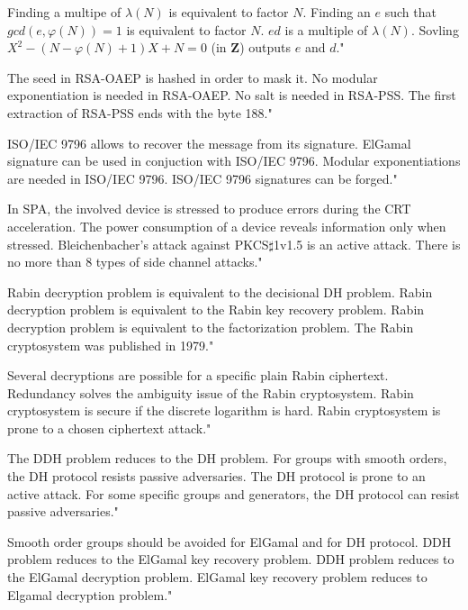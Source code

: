 {Finding a multipe of $\lambda(N)$ is equivalent to factor $N$.}
{Finding an $e$ such that $gcd(e,\varphi(N))=1$ is equivalent to factor $N$.}
{$ed$ is a multiple of $\lambda(N)$.}
{Sovling $X^2-(N-\varphi(N)+1)X+N=0$ (in $\mathbf{Z}$) outputs $e$ and $d$."}

{The seed in RSA-OAEP is hashed in order to mask it.}
{No modular exponentiation is needed in RSA-OAEP.}
{No salt is needed in RSA-PSS.}
{The first extraction of RSA-PSS ends with the byte 188."}

{ISO/IEC 9796 allows to recover the message from its signature.}
{ElGamal signature can be used in conjuction with ISO/IEC 9796.}
{Modular exponentiations are needed in ISO/IEC 9796.}
{ISO/IEC 9796 signatures can be forged."}

{In SPA, the involved device is stressed to produce errors during the CRT acceleration.}
{The power consumption of a device reveals information only when stressed.}
{Bleichenbacher's attack against PKCS$\sharp$1v1.5 is an active attack.}
{There is no more than 8 types of side channel attacks."}

{Rabin decryption problem is equivalent to the decisional DH problem.}
{Rabin decryption problem is equivalent to the Rabin key recovery problem.}
{Rabin decryption problem is equivalent to the factorization problem.}
{The Rabin cryptosystem was published in 1979."}

{Several decryptions are possible for a specific plain Rabin ciphertext.}
{Redundancy solves the ambiguity issue of the Rabin cryptosystem.}
{Rabin cryptosystem is secure if the discrete logarithm is hard.}
{Rabin cryptosystem is prone to a chosen ciphertext attack."}

{The DDH problem reduces to the DH problem.}
{For groups with smooth orders, the DH protocol resists passive adversaries.}
{The DH protocol is prone to an active attack.}
{For some specific groups and generators, the DH protocol can resist passive adversaries."}

{Smooth order groups should be avoided for ElGamal and for DH protocol.}
{DDH problem reduces to the ElGamal key recovery problem.}
{DDH problem reduces to the ElGamal decryption problem.}
{ElGamal key recovery problem reduces to Elgamal decryption problem."}

